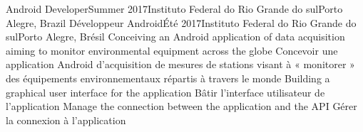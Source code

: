     \resumeSubheadingEnFr
      {Android Developer}{Summer 2017}{Instituto Federal do Rio Grande do sul}{Porto Alegre, Brazil}
      {Développeur Android}{Été 2017}{Instituto Federal do Rio Grande do sul}{Porto Alegre, Brésil}
            \resumeItemListStart
                \resumeItemEnFr
                    {Conceiving an Android application of data acquisition aiming to monitor environmental equipment across the globe}
                    {Concevoir une application Android d’acquisition de mesures de stations visant à   « monitorer » des équipements environnementaux répartis à travers le monde}
                \resumeItemEnFr
                    {Building a graphical user interface for the application}
                    {Bâtir l’interface utilisateur de l’application}
                \resumeItemEnFr
                    {Manage the connection between the application and the API}
                    {Gérer la connexion à l’application}
            \resumeItemListEnd
    \resumeSubHeadingListEnd



